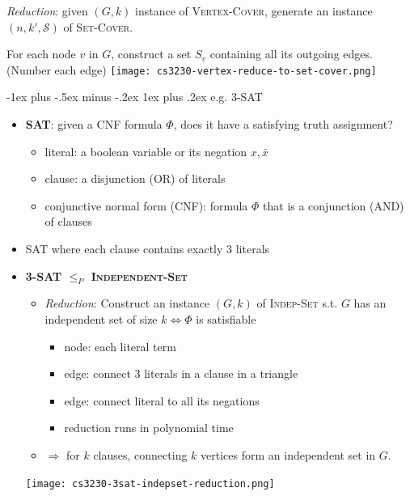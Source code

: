 \documentclass[10pt, landscape]{article}
\makeatletter
\renewcommand{\subsubsection}{\@startsection{subsubsection}{3}{0mm}%
  {-1ex plus -.5ex minus -.2ex}%
  {1ex plus .2ex}%
{\normalfont\small\bfseries}}%
\makeatother
\begin{document}
\begin{multicols*}{4}
  \textit{Reduction}: given $(G, k)$ instance of \textsc{Vertex-Cover}, generate an instance $(n, k', \mathcal{S})$ of \textsc{Set-Cover}.

  \begin{niceproof}
    For each node $v$ in $G$, construct a set $S_v$ containing all its outgoing edges. (Number each edge)
    \texttt{[image: cs3230-vertex-reduce-to-set-cover.png]} 
  \end{niceproof}

  \subsubsection{e.g. 3-SAT}

  \begin{itemize}
    \item \textbf{SAT}: given a CNF formula $\Phi$, does it have a satisfying truth assignment?
      \begin{itemize}
        \item literal: a boolean variable or its negation $x, \bar{x}$
        \item clause: a disjunction (OR) of literals
        \item conjunctive normal form (CNF): formula $\Phi$ that is a conjunction (AND) of clauses
      \end{itemize}
    \item {} SAT where each clause contains exactly $3$ literals
    \item \textbf{3-SAT $\leq_P$ \textsc{Independent-Set}}
      \begin{itemize}
        \item \textit{Reduction}: Construct an instance $(G, k)$ of \textsc{Indep-Set} s.t. $G$ has an independent set of size $k \iff \Phi$ is satisfiable
          \begin{itemize}
            \item node: each literal term
            \item edge: connect 3 literals in a clause in a triangle
            \item edge: connect literal to all its negations
            \item reduction runs in polynomial time
          \end{itemize}
        \item $\Rightarrow$ for $k$ clauses, connecting $k$ vertices form an independent set in $G$. 
      \end{itemize}
      \texttt{[image: cs3230-3sat-indepset-reduction.png]} 
  \end{itemize}


\end{multicols*}
\end{document}
